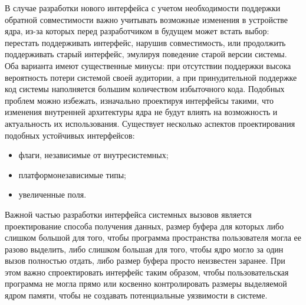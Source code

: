 В случае разработки нового интерфейса с учетом необходимости поддержки обратной
совместимости важно учитывать возможные изменения в устройстве ядра, из-за
которых перед разработчиком в будущем может встать выбор: перестать поддерживать
интерфейс, нарушив совместимость, или продолжить поддерживать старый интерфейс,
эмулируя поведение старой версии системы. Оба варианта имеют существенные
минусы: при отсутствии поддержки высока вероятность потери системой своей
аудитории, а при принудительной поддержке код системы наполняется большим
количеством избыточного кода. Подобных проблем можно избежать, изначально
проектируя интерфейсы такими, что изменения внутренней архитектуры ядра не будут
влиять на возможность и актуальность их использования. Существует несколько
аспектов проектирования подобных устойчивых интерфейсов:
\begin{itemize}
\item флаги, независимые от внутресистемных;
\item платформонезависимые типы;
\item увеличенные поля.
\end{itemize}

Важной частью разработки интерфейса системных вызовов является проектирование
способа получения данных, размер буфера для которых либо слишком большой для
того, чтобы программа пространства пользователя могла ее разово выделить, либо
слишком большая для того, чтобы ядро могло за один вызов полностью отдать, либо
размер буфера просто неизвестен заранее. При этом важно спроектировать интерфейс
таким образом, чтобы пользовательская программа не могла прямо или косвенно
контролировать размеры выделяемой ядром памяти, чтобы не создавать потенциальные
уязвимости в системе.

